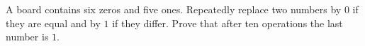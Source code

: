 A board contains six zeros and five ones. Repeatedly replace two numbers by $0$ if they are equal and by $1$ if they differ. Prove that after ten operations the last number is $1$.
